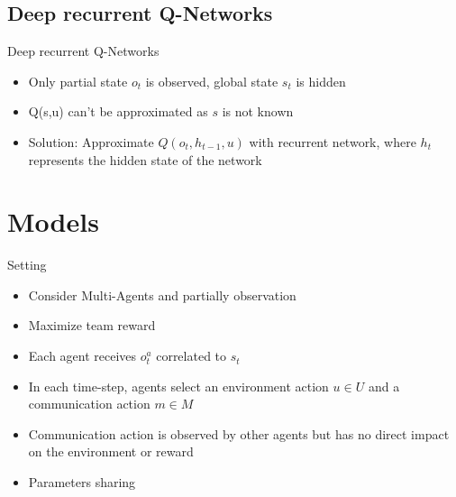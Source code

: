 \documentclass[mathserif]{beamer}
\begin{document}
\subsection{Deep recurrent Q-Networks}
\begin{frame}{Deep recurrent Q-Networks}
\begin{itemize}
  \item Only partial state $o_{t}$ is observed, global state $s_{t}$ is hidden

  \item Q(s,u) can't be approximated as $s$ is not known

  \item Solution: Approximate $Q(o_{t},h_{t-1},u)$ with recurrent network,
  where $h_{t}$ represents the hidden state of the network

\end{itemize}
\end{frame}
\section{Models}
\begin{frame}{Setting}
  \begin{itemize}
    \item Consider Multi-Agents and partially observation
    \item Maximize team reward
    \item Each agent receives $o_{t}^{a}$ correlated to $s_{t}$
    \item In each time-step, agents select an environment action $u\in U$
    and a communication action $m\in M$
    \item Communication action is observed by other agents but has no
    direct impact on the environment or reward
    \item Parameters sharing
  \end{itemize}
\end{frame}
\end{document}
